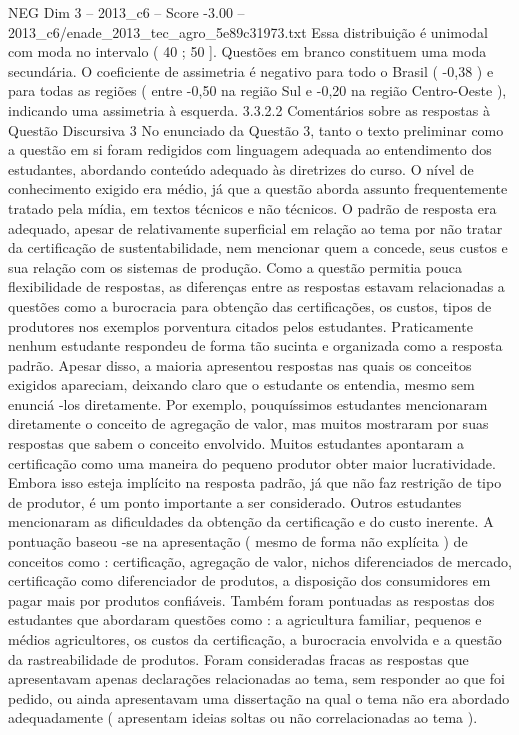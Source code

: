 \begin{textsample}{NEG Dim 3 – 2013\_c6 – Score -3.00 – 2013\_c6/enade\_2013\_tec\_agro\_5e89c31973.txt}
Essa distribuição é unimodal com moda no intervalo ( 40 ; 50 ].
Questões em branco constituem uma moda secundária.
O coeficiente de assimetria é negativo para todo o Brasil ( -0,38 ) e para todas as regiões ( entre -0,50 na região Sul e -0,20 na região Centro-Oeste ), indicando uma assimetria à esquerda. 3.3.2.2 Comentários sobre as respostas à Questão Discursiva 3 No enunciado da Questão 3, tanto o texto preliminar como a questão em si foram redigidos com linguagem adequada ao entendimento dos estudantes, abordando conteúdo adequado às diretrizes do curso.
O nível de conhecimento exigido era médio, já que a questão aborda assunto frequentemente tratado pela mídia, em textos técnicos e não técnicos.
O padrão de resposta era adequado, apesar de relativamente superficial em relação ao tema por não tratar da certificação de sustentabilidade, nem mencionar quem a concede, seus custos e sua relação com os sistemas de produção.
Como a questão permitia pouca flexibilidade de respostas, as diferenças entre as respostas estavam relacionadas a questões como a burocracia para obtenção das certificações, os custos, tipos de produtores nos exemplos porventura citados pelos estudantes.
Praticamente nenhum estudante respondeu de forma tão sucinta e organizada como a resposta padrão.
Apesar disso, a maioria apresentou respostas nas quais os conceitos exigidos apareciam, deixando claro que o estudante os entendia, mesmo sem enunciá -los diretamente.
Por exemplo, pouquíssimos estudantes mencionaram diretamente o conceito de agregação de valor, mas muitos mostraram por suas respostas que sabem o conceito envolvido.
Muitos estudantes apontaram a certificação como uma maneira do pequeno produtor obter maior lucratividade.
Embora isso esteja implícito na resposta padrão, já que não faz restrição de tipo de produtor, é um ponto importante a ser considerado.
Outros estudantes mencionaram as dificuldades da obtenção da certificação e do custo inerente.
A pontuação baseou -se na apresentação ( mesmo de forma não explícita ) de conceitos como : certificação, agregação de valor, nichos diferenciados de mercado, certificação como diferenciador de produtos, a disposição dos consumidores em pagar mais por produtos confiáveis.
Também foram pontuadas as respostas dos estudantes que abordaram questões como : a agricultura familiar, pequenos e médios agricultores, os custos da certificação, a burocracia envolvida e a questão da rastreabilidade de produtos.
Foram consideradas fracas as respostas que apresentavam apenas declarações relacionadas ao tema, sem responder ao que foi pedido, ou ainda apresentavam uma dissertação na qual o tema não era abordado adequadamente ( apresentam ideias soltas ou não correlacionadas ao tema ).

\end{textsample}
